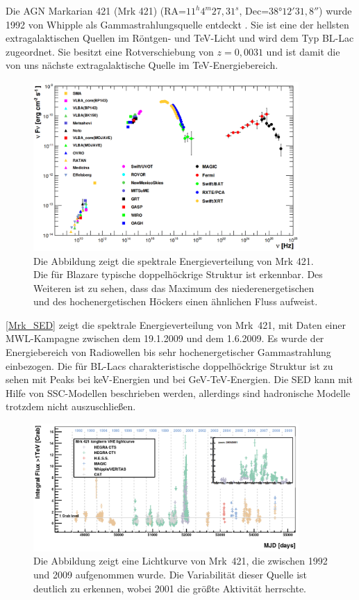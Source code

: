 Die AGN Markarian 421 (Mrk 421) (RA=$11^h 4^m 27,31^s$, Dec=$38°12' 31,8''$) wurde 1992 von Whipple als Gammastrahlungsquelle entdeckt \cite{EntdeckungWhipple}.
Sie ist eine der hellsten extragalaktischen Quellen im Röntgen- und TeV-Licht und wird dem Typ BL-Lac zugeordnet.
Sie besitzt eine Rotverschiebung von $z=0,0031$ und ist damit die von uns nächste extragalaktische Quelle im TeV-Energiebereich.\cite{MWL2009}

\begin{figure}
    \centering
    \includegraphics[width=0.9\textwidth]{./Plots/02_Astroteilchenphysik/SED_Mrk421.png}
    \caption{Die Abbildung zeigt die spektrale Energieverteilung von Mrk 421. Die für Blazare typische doppelhöckrige Struktur ist erkennbar. 
     Des Weiteren ist zu sehen, dass das Maximum des niederenergetischen und des hochenergetischen Höckers einen ähnlichen Fluss aufweist.\cite{Mrk421_SED}}
    \label{Mrk_SED}
\end{figure}

\autoref{Mrk_SED} zeigt die spektrale Energieverteilung von Mrk~421, mit Daten einer MWL-Kampagne zwischen dem 19.1.2009 und dem 1.6.2009. 
Es wurde der Energiebereich von Radiowellen bis sehr hochenergetischer Gammastrahlung einbezogen.
Die für BL-Lacs charakteristische doppelhöckrige Struktur ist zu sehen mit Peaks bei keV-Energien und bei GeV-TeV-Energien.
Die SED kann mit Hilfe von SSC-Modellen beschrieben werden, allerdings sind hadronische Modelle trotzdem nicht auszuschließen.

\begin{figure}
    \centering
    \includegraphics[width=0.9\textwidth]{./Plots/02_Astroteilchenphysik/Mrk421_LC_lang.png}
    \caption{Die Abbildung zeigt eine Lichtkurve von Mrk~421, die zwischen 1992 und 2009 aufgenommen wurde.
    Die Variabilität dieser Quelle ist deutlich zu erkennen, wobei 2001 die größte Aktivität herrschte.\cite{Mrk421_LC_lang}}
    \label{Mrk421_LC_Alles}
\end{figure}


